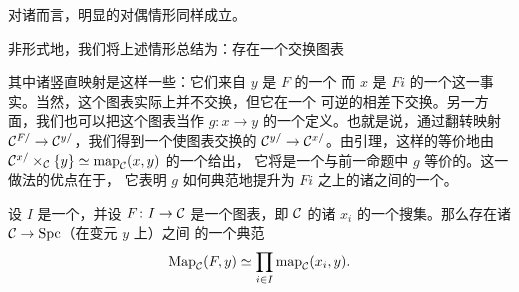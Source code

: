 \begin{remark}\label{rem:dual-induced-map-limits}
对诸\trLimit{}\trCocone{}而言，明显的对偶情形同样成立。
\end{remark}

\begin{observation}\label{obs:induced-map-informal}
非形式地，我们将上述情形总结为：存在一个交换图表
\begin{center}
\end{center}
其中诸竖直映射是这样一些\trEquivalence{}：它们来自 $y$ 是 $F$ 的一个\trColimit{}%
而 $x$ 是 $Fi$ 的一个\trColimit{}这一事实。当然，这个图表实际上并不交换，但它在一个
可逆\trNaturalTransformation{}的相差下交换。另一方面，我们也可以把这个图表当作%
\trMorphism{} $g\colon x \to y$ 的一个定义。也就是说，通过翻转映射
$\mathcal{C}^{F/} \to \mathcal{C}^{y/}$，我们得到一个使图表交换的\trFunctor{}%
$\mathcal{C}^{y/} \to \mathcal{C}^{x/}$。由\trYoneda{}引理，这样的\trFunctor{}等价地由
$\mathcal{C}^{x/} \times_{\mathcal{C}} \{y\} \simeq \mathrm{map}_{\mathcal{C}}(x, y)$ 的一个\trObject{}给出，
它将是一个与前一命题中\trMorphism{} $g$ 等价的\trMorphism{}。这一做法的优点在于，
它表明\trMorphism{} $g$ 如何典范地提升为 $Fi$ 之上的诸\trCone{}之间的一个\trMorphism{}。
\end{observation}

\begin{lemma}\label{lem:coproduct-map-product}
设 $I$ 是一个\trDiscreteCategory{}，并设 $F\colon I \to \mathcal{C}$ 是一个图表，即 $\mathcal{C}$ 的诸\trObject{}%
$x_i$ 的一个搜集。那么存在诸\trFunctor{} $\mathcal{C} \to \mathrm{Spc}$（在变元 $y$ 上）之间
的一个典范\trEquivalence{}%
\[
\mathrm{Map}_{\mathcal{C}}(F, y) \simeq \prod_{i \in I} \mathrm{map}_{\mathcal{C}}(x_i, y).
\]
\end{lemma}

